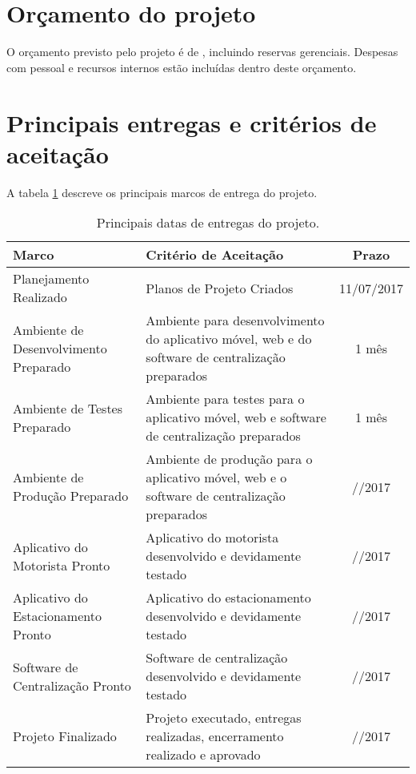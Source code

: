 \section{Orçamento do projeto}

O orçamento previsto pelo projeto é de \maximumBudget, incluindo reservas gerenciais. Despesas com pessoal e recursos internos estão incluídas dentro deste orçamento.

\section{Principais entregas e critérios de aceitação}

A tabela \ref{tab:entregas} descreve os principais marcos de entrega do projeto.

\begin{table}[h]
	\begin{tabularx}{.9\textwidth}{| X | X | c |}
		\hline
		\textbf{Marco}                               & \textbf{Critério de Aceitação}                     & \textbf{Prazo} \\
		\hline
		Planejamento Realizado & Planos de Projeto Criados & 11/07/2017 \\
		\hline
		Ambiente de Desenvolvimento Preparado & Ambiente para desenvolvimento do aplicativo móvel, web e do software de centralização preparados & 1 mês \\
		\hline
		Ambiente de Testes Preparado & Ambiente para testes para o aplicativo móvel, web e software de centralização preparados & 1 mês \\
		\hline
		Ambiente de Produção Preparado & Ambiente de produção para o aplicativo móvel, web e o software de centralização preparados & //2017 \\
		\hline
		Aplicativo do Motorista Pronto & Aplicativo do motorista desenvolvido e devidamente testado & //2017 \\
		\hline
		Aplicativo do Estacionamento Pronto & Aplicativo do estacionamento desenvolvido e devidamente testado & //2017 \\
		\hline
		Software de Centralização Pronto & Software de centralização desenvolvido e devidamente testado & //2017 \\
		\hline
		Projeto Finalizado & Projeto executado, entregas realizadas, encerramento realizado e aprovado & //2017 \\
		\hline
	\end{tabularx}
	\centering
	\caption{Principais datas de entregas do projeto.}
	\label{tab:entregas}
\end{table}

